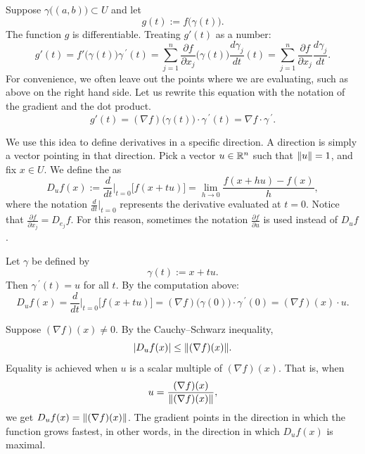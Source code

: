 Suppose $\gamma\bigl((a,b)\bigr) \subset U$ and let
\begin{equation*}
g(t) := f\bigl(\gamma(t)\bigr) .
\end{equation*}
The function
$g$ is differentiable. Treating $g'(t)$ as a number:
\begin{equation*}
g'(t) =
f'\bigl(\gamma(t)\bigr) \gamma^{\:\prime}(t)
=
\sum_{j=1}^n
\frac{\partial f}{\partial x_j} \bigl(\gamma(t)\bigr)
\frac{d\gamma_j}{dt} (t)
=
\sum_{j=1}^n
\frac{\partial f}{\partial x_j}
\frac{d\gamma_j}{dt} .
\end{equation*}
For convenience,
we often 
leave out the points where we are evaluating,
such as above on the right hand side.
Let us rewrite this equation
with the notation of the gradient and the dot product.
\begin{equation*}
g'(t) = (\nabla f) \bigl(\gamma(t)\bigr) \cdot \gamma^{\:\prime}(t)
= \nabla f \cdot \gamma^{\:\prime}.
\end{equation*}

We use this idea to define derivatives in a specific direction.  A direction
is simply a vector pointing in that direction.  Pick a vector $u \in {\mathbb{R}}^n$
such that $\lVert {u} \rVert = 1$, and fix $x \in U$.
We define the
\emph{} as
\begin{equation*}
D_u f (x) := \frac{d}{dt}\Big|_{t=0} \bigl[ f(x+tu) \bigr] =
\lim_{h\to 0}
\frac{f(x+hu)-f(x)}{h} ,
\end{equation*}
where the notation
$\frac{d}{dt}\big|_{t=0}$ represents the derivative evaluated at $t=0$.
Notice that $\frac{\partial f}{\partial x_j} = D_{e_j} f$.
For this reason, sometimes the notation $\frac{\partial f}{\partial u}$
is used instead of $D_u f$.

Let $\gamma$ be defined by
\begin{equation*}
\gamma(t) := x + tu .
\end{equation*}
Then $\gamma^{\:\prime}(t) = u$ for all $t$.  
By the computation above:
\begin{equation*}
D_u f (x) =
\frac{d}{dt}\Big|_{t=0} \bigl[ f(x+tu) \bigr] =
(\nabla f) \bigl(\gamma(0)\bigr) \cdot \gamma^{\:\prime}(0)
=
(\nabla f) (x) \cdot u .
\end{equation*}

Suppose $(\nabla f)(x) \neq 0$.
By the Cauchy--Schwarz inequality,
\begin{equation*}
\lvert {D_u f(x)} \rvert \leq \lVert {(\nabla f)(x)} \rVert .
\end{equation*}
Equality is achieved when $u$ is a scalar multiple of
$(\nabla f)(x)$.  That is, when
\begin{equation*}
u = 
\frac{(\nabla f)(x)}{\lVert {(\nabla f)(x)} \rVert} ,
\end{equation*}
we get $D_u f(x) = \lVert {(\nabla f)(x)} \rVert$.
The gradient points in the direction in which the
function grows fastest, in other words, in the direction in which $D_u f(x)$ is maximal.

